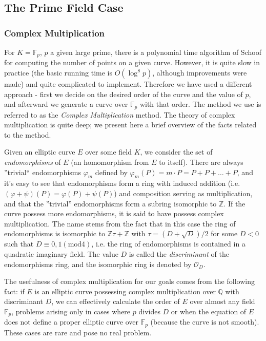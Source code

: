 \documentclass[11pt,english]{article}
\begin{document}
\subsection{The Prime Field Case}
\subsubsection{Complex Multiplication}
For $K=\mathbb{F}_p$, $p$ a given large prime, there is a polynomial time algorithm of Schoof for computing the number of points on a given curve.
However, it is quite slow in practice (the basic running time is $O(\log ^8p)$, although improvements were made) and quite complicated to implement.
Therefore we have used a different approach - first we decide on the desired order of the curve and the value of $p$, and afterward we generate a
curve over $\mathbb{F}_p$ with that order. The method we use is referred to as the \emph{Complex Multiplication} method. The theory of complex
multiplication is quite deep; we present here a brief overview of the facts related to the method.

Given an elliptic curve $E$ over some field $K$, we consider the set of \emph{endomorphisms} of $E$ (an homomorphism from $E$ to itself). There are
always ''trivial`` endomorphisms $\varphi_m$ defined by $\varphi_m(P)=m\cdot P=P+P+\dots+P$, and it's easy to see that endomorphisms form a ring
with induced addition (i.e. $(\varphi+\psi)(P)=\varphi(P)+\psi(P)$) and composition serving as multiplication, and that the ''trivial'' endomorphisms form a subring
isomorphic to $\mathbb{Z}$. If the curve possess more endomorphisms, it is said to have possess complex multiplication. The name stems from
the fact that in this case the ring of endomorphisms is isomorphic to $\mathbb{Z}\tau+\mathbb{Z}$ with $\tau = (D+\sqrt{D})/2$ for some $D<0$
such that $D\equiv 0,1 (\mathrm{mod }4)$, i.e. the ring of endomorphisms is contained in a quadratic imaginary field. The value $D$ is called the \emph{discriminant} of the
endomorphisms ring, and the isomorphic ring is denoted by $\mathcal{O}_D$.

The usefulness of complex multiplication for our goals comes from the following fact: if $E$ is an elliptic curve possessing complex multiplication over $\mathbb{Q}$
with discriminant $D$, we can effectively calculate the order of $E$ over almost any field $\mathbb{F}_p$, problems arising only in cases where $p$ divides $D$ or
when the equation of $E$ does not define a proper elliptic curve over $\mathbb{F}_p$ (because the curve is not smooth). These cases are rare and
pose no real problem.
\end{document}
